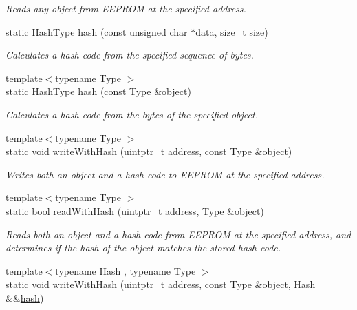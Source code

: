 \begin{DoxyCompactItemize}
\begin{DoxyCompactList}\small\item\em Reads any object from E\+E\+P\+R\+OM at the specified address. \end{DoxyCompactList}\item 
static \mbox{\hyperlink{classArduboy2EEPROM_a58f4ede0b1a6b773e269fd4604e489b7}{Hash\+Type}} \mbox{\hyperlink{classArduboy2EEPROM_a03bad380b02c4aa613f5a84b7e2712b6}{hash}} (const unsigned char $\ast$data, size\+\_\+t size)
\begin{DoxyCompactList}\small\item\em Calculates a hash code from the specified sequence of bytes. \end{DoxyCompactList}\item 
{\footnotesize template$<$typename Type $>$ }\\static \mbox{\hyperlink{classArduboy2EEPROM_a58f4ede0b1a6b773e269fd4604e489b7}{Hash\+Type}} \mbox{\hyperlink{classArduboy2EEPROM_a64c8b410796152924d0a334abac8fcfd}{hash}} (const Type \&object)
\begin{DoxyCompactList}\small\item\em Calculates a hash code from the bytes of the specified object. \end{DoxyCompactList}\item 
{\footnotesize template$<$typename Type $>$ }\\static void \mbox{\hyperlink{classArduboy2EEPROM_a55111051528b8d43a03bd7dd842b0679}{write\+With\+Hash}} (uintptr\+\_\+t address, const Type \&object)
\begin{DoxyCompactList}\small\item\em Writes both an object and a hash code to E\+E\+P\+R\+OM at the specified address. \end{DoxyCompactList}\item 
{\footnotesize template$<$typename Type $>$ }\\static bool \mbox{\hyperlink{classArduboy2EEPROM_abbfe69135a48dc52120d209bfba38b7a}{read\+With\+Hash}} (uintptr\+\_\+t address, Type \&object)
\begin{DoxyCompactList}\small\item\em Reads both an object and a hash code from E\+E\+P\+R\+OM at the specified address, and determines if the hash of the object matches the stored hash code. \end{DoxyCompactList}\item 
{\footnotesize template$<$typename Hash , typename Type $>$ }\\static void \mbox{\hyperlink{classArduboy2EEPROM_a40f0abec863d2772e8da19d3cf37e980}{write\+With\+Hash}} (uintptr\+\_\+t address, const Type \&object, Hash \&\&\mbox{\hyperlink{classArduboy2EEPROM_a03bad380b02c4aa613f5a84b7e2712b6}{hash}})

\end{DoxyCompactItemize}
